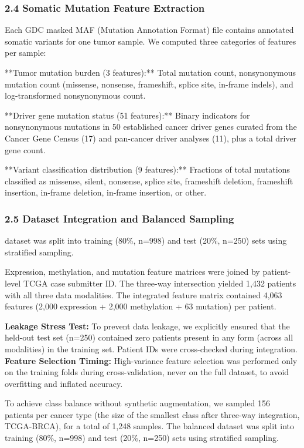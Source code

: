 \subsubsection{2.4 Somatic Mutation Feature
Extraction}\label{somatic-mutation-feature-extraction}

Each GDC masked MAF (Mutation Annotation Format) file contains annotated
somatic variants for one tumor sample. We computed three categories of
features per sample:

**Tumor mutation burden (3 features):** Total mutation count,
nonsynonymous mutation count (missense, nonsense, frameshift, splice
site, in-frame indels), and log-transformed nonsynonymous count.

**Driver gene mutation status (51 features):** Binary indicators for
nonsynonymous mutations in 50 established cancer driver genes curated
from the Cancer Gene Census (17) and pan-cancer driver analyses (11),
plus a total driver gene count.

**Variant classification distribution (9 features):** Fractions of total
mutations classified as missense, silent, nonsense, splice site,
frameshift deletion, frameshift insertion, in-frame deletion, in-frame
insertion, or other.

\subsubsection{2.5 Dataset Integration and Balanced
Sampling}\label{dataset-integration-and-balanced-sampling}

dataset was split into training (80\%, n=998) and test (20\%, n=250)
sets using stratified sampling.

Expression, methylation, and mutation feature matrices were joined by
patient-level TCGA case submitter ID. The three-way intersection yielded
1,432 patients with all three data modalities. The integrated feature
matrix contained 4,063 features (2,000 expression + 2,000 methylation +
63 mutation) per patient.

\textbf{Leakage Stress Test:} To prevent data leakage, we explicitly
ensured that the held-out test set (n=250) contained zero patients
present in any form (across all modalities) in the training set. Patient
IDs were cross-checked during integration. \textbf{Feature Selection
Timing:} High-variance feature selection was performed only on the
training folds during cross-validation, never on the full dataset, to
avoid overfitting and inflated accuracy.

To achieve class balance without synthetic augmentation, we sampled 156
patients per cancer type (the size of the smallest class after three-way
integration, TCGA-BRCA), for a total of 1,248 samples. The balanced
dataset was split into training (80\%, n=998) and test (20\%, n=250)
sets using stratified sampling.

